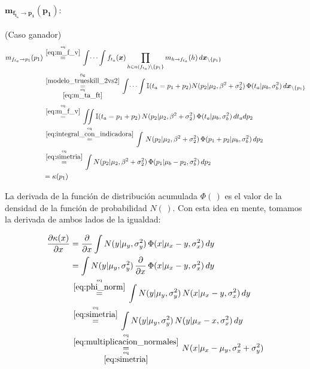 \documentclass[article]{jss}
\newcommand\hfrac[2]{\genfrac{}{}{0pt}{}{#1}{#2}} %
\begin{document}
\begin{appendix}
\paragraph{$\bm{m_{f_{t_a} \rightarrow p_1}(p_1)}:$} (Caso ganador)
\begin{equation}\label{eq:m_fta_p_inicial}
\begin{split}
m_{f_{t_a} \rightarrow p_1}(p_1)  &\overset{\hfrac{\text{eq}}{\ref{eq:m_f_v}}}{=} \int \dots \int f_{t_a}(\bm{x}) \prod_{h \in n(f_{t_a}) \setminus \{p_1\} } m_{h \rightarrow f_{t_a}}(h) \, d\bm{x}_{\setminus \{p_1\} }  \\
&\overset{\hfrac{\text{fig}}{\ref{modelo_trueskill_2vs2}}}{\underset{\hfrac{\text{eq}}{\ref{eq:m_ta_ft}}}{=}} \int \dots \int \mathbb{I}( t_a = p_1 + p_2) N(p_2| \mu_2, \beta^2 + \sigma_2^2 ) \, \Phi (t_a| \mu_b , \sigma_b^2 ) \, d\bm{x}_{\setminus \{p_1\} }\\[0.1cm]
&\overset{\hfrac{\text{eq}}{\ref{eq:m_f_v}}}{=} \iint \mathbb{I}( t_a = p_1 + p_2) \, N(p_2| \mu_2, \beta^2 + \sigma_2^2 ) \, \Phi (t_a| \mu_b , \sigma_b^2 ) \, dt_a dp_2 \\
&\overset{\hfrac{\text{eq}}{\ref{eq:integral_con_indicadora}}}{=} \int  \, N(p_2| \mu_2, \beta^2 + \sigma_2^2 ) \, \Phi (p_1 + p_2| \mu_b , \sigma_b^2 ) \, dp_2 \\
&\overset{\hfrac{\text{eq}}{\ref{eq:simetria}}}{=} \int  N(p_2| \mu_2, \beta^2 + \sigma_2^2 ) \, \Phi (p_1 | \mu_b - p_2 , \sigma_b^2) \, dp_2 \\
&= \kappa(p_1)
\end{split}
\end{equation}

La derivada de la funci\'on de distribuci\'on acumulada $\Phi(\,)$ es el valor de la densidad de la funci\'on de probabilidad $N(\,)$. Con esta idea en mente, tomamos la derivada de ambos lados de la igualdad:

\begin{equation}\label{eq:ta-p_derivada}
\begin{split}
\frac{\partial\kappa(x)}{\partial x} &= \frac{\partial}{\partial x} \int  N(y| \mu_y, \sigma_y^2 ) \,   \Phi (x | \mu_x -y , \sigma_x^2 ) \, dy \\
&= \int  N(y| \mu_y, \sigma_y^2 ) \, \frac{\partial}{\partial x} \,\Phi (x| \mu_x - y, \sigma_x^2 )  \, dy   \\
& \overset{\hfrac{\text{eq}}{\ref{eq:phi_norm}}}{=} \int  N(y| \mu_y, \sigma_y^2 ) \, N(x| \mu_x -y , \sigma_x^2)  \, dy  \\
& \overset{\hfrac{\text{eq}}{\ref{eq:simetria}}}{=} \int  N(y| \mu_y, \sigma_y^2 ) \, N(y| \mu_x  -x , \sigma_x^2)  \, dy  \\
&\overset{\hfrac{\text{eq}}{\ref{eq:multiplicacion_normales}}}{\underset{\hfrac{\text{eq}}{\ref{eq:simetria}}}{=}} N(x| \mu_x - \mu_y, \sigma_x^2 + \sigma_y^2)
\end{split}
\end{equation}


\end{appendix}
\end{document}
